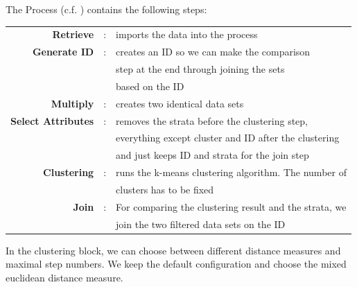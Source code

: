 	The Process (c.f. ) contains the following steps:\\

	\begin{tabular}{r c l}
		\textbf{Retrieve} & : &  imports the data into the process \\
		\textbf{Generate ID} & : & creates an ID so we can make the comparison\\
		 & & step at the end through joining the sets\\
		 && based on the ID\\
		\textbf{Multiply} & : & creates two identical data sets\\
		\textbf{Select Attributes} & : &  removes the strata before the clustering step,\\
		& & everything except cluster and ID after the clustering \\
		& & and just keeps ID and strata for the join step\\
		\textbf{Clustering} & : &  runs the k-means clustering algorithm. The number of \\
		& & clusters has to be fixed \\
		\textbf{Join} & : & For comparing the clustering result and the strata, we \\
		& & join the two filtered data sets on the ID \\
	\end{tabular}
	
	In the clustering block, we can choose between different distance measures and maximal step numbers. We keep the default configuration and choose the mixed euclidean distance measure.
\vspace*{-1em}
